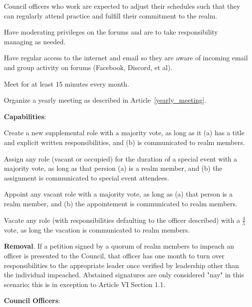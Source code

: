 \documentclass[12pt]{article}
\begin{document}
\begin{level}
\begin{level}
\begin{level}
\begin{level}
                    \item Council officers who work are expected to adjust their schedules such that they can regularly attend practice and fulfill their commitment to the realm.
                \end{level}   
                \item Have moderating privileges on the forums and are to take responsibility managing as needed.
                \item Have regular access to the internet and email so they are aware of incoming email and group activity on forums (Facebook, Discord, et al).
                \item Meet for at least 15 minutes every month.
                \item Organize a yearly meeting as described in Article~\ref{yearly_meeting}.
            \end{level}
            \item \textbf{Capabilities}:
            \begin{level}
                \item Create a new supplemental role with a majority vote, as long as it (a) has a title and explicit written responsibilities, and (b) is communicated to realm members.
                \item Assign any role (vacant or occupied) for the duration of a special event with a majority vote, as long as that persion (a) is a realm member, and (b) the assignment is communicated to special event attendees.
                \item Appoint any vacant role with a majority vote, as long as (a) that person is a realm member, and (b) the appointement is communicated to realm members.
                \item Vacate any role (with responsibilities defaulting to the officer described) with a \(\frac{4}{5}\) vote, as long the vacation is communicated to realm members.
            \end{level}
        \item \textbf{Removal}. If a petition signed by a quorum of realm members to impeach an officer is presented to the Council, that officer has one month to turn over responsibilities to the appropriate leader once verified by leadership other than the individual impeached. Abstained signatures are only considered "nay" in this scenario; this is in exception to Article VI Section 1.1.
    \end{level}
    \item \textbf{Council Officers}:

\end{level}
\end{document}
